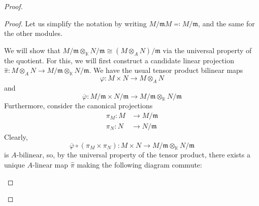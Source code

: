 \begin{problem}
\begin{enumerate}[label=(\theproblem.\arabic*),ref=\theproblem.\arabic*]
\begin{sol}
\begin{proof}
\begin{claim}
\begin{proof}
                                Let us simplify the notation by writing $M/\mathfrak{m}M \eqqcolon M/\mathfrak{m}$, and the same for the other modules.

                                We will show that $M/\mathfrak{m} \otimes_\mathbb{K} N/\mathfrak{m} \cong (M \otimes_A N)/\mathfrak{m}$ via the universal property of the quotient.
                                For this, we will first construct a candidate linear projection \linebreak
                                ${\hat{\pi}: M \otimes_A N \rightarrow M/\mathfrak{m} \otimes_\mathbb{K} N/\mathfrak{m}}$.
                                We have the usual tensor product bilinear maps
                                \[\varphi: M \times N \rightarrow M \otimes_A N\]
                                and
                                \[\overline{\varphi}: M/\mathfrak{m} \times N/\mathfrak{m} \rightarrow M/\mathfrak{m} \otimes_\mathbb{K} N/\mathfrak{m}\]
                                Furthermore, consider the canonical projections
                                \begin{align*}
                                    \pi_M: M &\rightarrow M/\mathfrak{m}\\
                                    \pi_N: N &\rightarrow N/\mathfrak{m}
                                \end{align*}
                                Clearly,
                                \[\overline{\varphi} \circ (\pi_M \times \pi_N): M \times N \rightarrow M/\mathfrak{m} \otimes_{\mathbb{K}} N/\mathfrak{m}\]
                                is $A$-bilinear, so, by the universal property of the tensor product, there exists a unique $A$-linear map $\hat{\pi}$ making the following diagram commute:

                                \begin{center}
                                \end{center}


\end{proof}
\end{claim}
\end{proof}
\end{sol}
\end{enumerate}
\end{problem}
